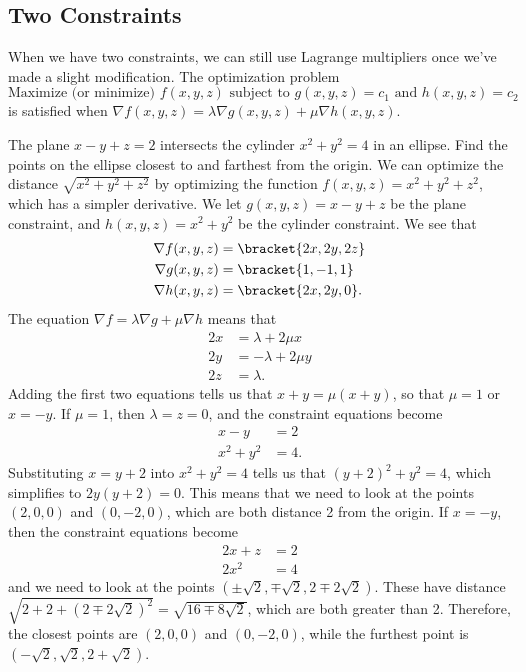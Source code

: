 \subsection{Two Constraints}

When we have two constraints, we can still use Lagrange multipliers once we've made a slight modification.  The optimization problem
\[
 \text{Maximize (or minimize) }f(x,y,z)\text{ subject to }
 g(x,y,z)=c_1\text{ and }h(x,y,z)=c_2
\]
is satisfied when $\nabla f(x,y,z)=\lambda\nabla g(x,y,z)+\mu\nabla h(x,y,z)$.

\begin{example}\label{ex_lang_two_const}
The plane $x-y+z=2$ intersects the cylinder $x^2+y^2=4$ in an ellipse. Find the points on the ellipse closest to and farthest from the origin.
\solution
We can optimize the distance $\sqrt{x^2+y^2+z^2}$ by optimizing the function $f(x,y,z)=x^2+y^2+z^2$, which has a simpler derivative.  We let $g(x,y,z)=x-y+z$ be the plane constraint, and $h(x,y,z)=x^2+y^2$ be the cylinder constraint.  We see that
\begin{align*}
 \nabla f(x,y,z)&=\bracket{2x,2y,2z} \\
 \nabla g(x,y,z)&=\bracket{1,-1,1} \\
 \nabla h(x,y,z)&=\bracket{2x,2y,0}.
\end{align*}
The equation $\nabla f=\lambda\nabla g+\mu\nabla h$ means that 
\begin{align*}
 2x&=\lambda+2\mu x\\
 2y&=-\lambda+2\mu y\\
 2z&=\lambda.
\end{align*}
Adding the first two equations tells us that $x+y=\mu(x+y)$, so that $\mu=1$ or $x=-y$.  If $\mu=1$, then $\lambda=z=0$, and the constraint equations become
\begin{align*}
 x-y&=2\\
 x^2+y^2&=4.
\end{align*}
Substituting $x=y+2$ into $x^2+y^2=4$ tells us that $(y+2)^2+y^2=4$,
which simplifies to $2y(y+2)=0$.  This means that we need to look at the points $(2,0,0)$ and $(0,-2,0)$, which are both distance 2 from the origin.  If $x=-y$, then the constraint equations become
\begin{align*}
 2x+z&=2\\
 2x^2&=4
\end{align*}
and we need to look at the points $(\pm\sqrt2,\mp\sqrt2,2\mp2\sqrt2)$.  These have distance
$\sqrt{2+2+(2\mp2\sqrt2)^2}
=\sqrt{16\mp8\sqrt2}$, which are both greater than 2.  Therefore, the closest points are $(2,0,0)$ and $(0,-2,0)$, while the furthest point is $(-\sqrt2,\sqrt2,2+\sqrt2)$.
\end{example}

